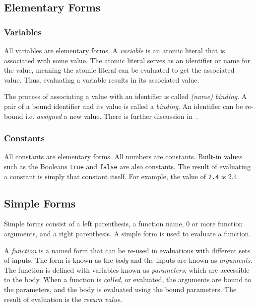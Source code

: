 \documentclass[a4paper, 12pt]{article}
\begin{document}
\subsection{Elementary Forms}
\subsubsection{Variables}
All variables are elementary forms. A \textit{variable} is an atomic literal that is associated with some value. The atomic literal serves as an identifier or name for the value, meaning the atomic literal can be evaluated to get the associated value. Thus, evaluating a variable results in its associated value.

The process of associating a value with an identifier is called \textit{(name) binding}. A pair of a bound identifier and its value is called a \textit{binding}. An identifier can be re-bound i.e. \textit{assigned} a new value. There is further discussion in~.

\subsubsection{Constants}
All constants are elementary forms. All numbers are constants. Built-in values such as the Booleans \texttt{true} and \texttt{false} are also constants. The result of evaluating a constant is simply that constant itself. For example, the value of \texttt{2.4} is 2.4.

\subsection{Simple Forms}\label{subsubsec:simpleforms}
Simple forms consist of a left parenthesis, a function name, 0 or more function arguments, and a right parenthesis. A simple form is used to evaluate a function.

A \textit{function} is a named form that can be re-used in evaluations with different sets of inputs. The form is known as the \textit{body} and the inputs are known as \textit{arguments}. The function is defined with variables known as \textit{parameters}, which are accessible to the body. When a function is \textit{called}, or evaluated, the arguments are bound to the parameters, and the body is evaluated using the bound parameters. The result of evaluation is the \textit{return value}.
\end{document}
